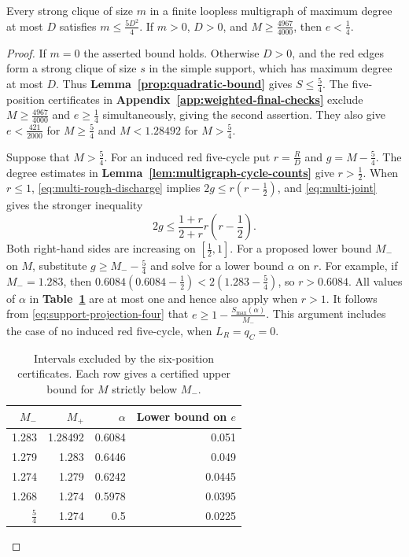



\begin{lemma}\label{prop:multi-uniform}
Every strong clique of size $m$ in a finite loopless multigraph of maximum
degree at most $D$ satisfies $m\le\frac{5D^2}{4}$. If $m>0$, $D>0$, and
$M\ge\frac{4967}{4000}$,
then $e<\frac{1}{4}$.
\end{lemma}

\begin{proof}
If $m=0$ the asserted bound holds. Otherwise $D>0$, and the
red edges form a strong clique of size $s$ in the simple support,
which has maximum degree at most $D$. Thus
\textbf{Lemma~\ref{prop:quadratic-bound}} gives $S\leq\frac{5}{4}$.
The five-position certificates in \textbf{Appendix~\ref{app:weighted-final-checks}}
exclude $M\geq\frac{4967}{4000}$ and $e\geq\frac14$ simultaneously,
giving the second assertion. They also give
$e<\frac{421}{2000}$ for $M\geq\frac54$ and $M<1.28492$ for
$M>\frac54$.

Suppose that $M>\frac54$. For an induced red five-cycle put
$r=\frac RD$ and $g=M-\frac54$. The degree estimates in
\textbf{Lemma~\ref{lem:multigraph-cycle-counts}} give $r>\frac12$.
When $r\leq1$, \eqref{eq:multi-rough-discharge} implies
$2g\leq r(r-\frac12)$, and \eqref{eq:multi-joint} gives the
stronger inequality
\[
 2g\leq\frac{1+r}{2+r}r\left(r-\frac12\right).
\]
Both right-hand sides are increasing on $[\frac12,1]$.
For a proposed lower bound $M_-$ on $M$, substitute
$g\geq M_--\frac54$ and solve for a lower bound $\alpha$ on $r$.
For example, if $M_-=1.283$, then
$0.6084(0.6084-\frac12)<2(1.283-\frac54)$, so $r>0.6084$.
All values of $\alpha$ in \textbf{Table~\ref{tab:uniform-chain}}
are at most one and hence also apply when $r>1$.
It follows from \eqref{eq:support-projection-four} that
$e\geq1-\frac{S_{\max}(\alpha)}{M_-}$. This argument includes the
case of no induced red five-cycle, when $L_R=q_C=0$.

\begin{table}[htbp]
\centering
\caption{Intervals excluded by the six-position certificates. Each row
gives a certified upper bound for $M$ strictly below $M_-$.}
\label{tab:uniform-chain}
\begin{tabular}{@{}rrrr@{}}
\toprule
$M_-$ & $M_+$ & $\alpha$ & Lower bound on $e$\\
\midrule
1.283 & 1.28492 & 0.6084 & 0.051\\
1.279 & 1.283 & 0.6446 & 0.049\\
1.274 & 1.279 & 0.6242 & 0.0445\\
1.268 & 1.274 & 0.5978 & 0.0395\\
$\frac54$ & 1.274 & 0.5 & 0.0225\\
\bottomrule
\end{tabular}
\end{table}


\end{proof}
